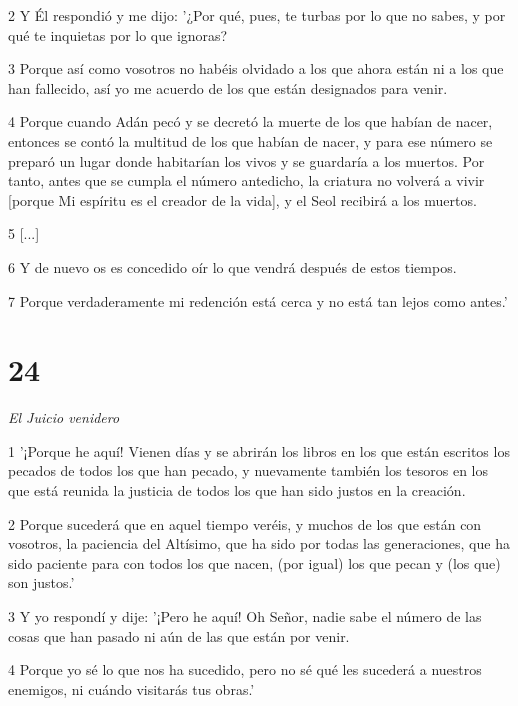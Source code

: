 \par 2 Y Él respondió y me dijo: '¿Por qué, pues, te turbas por lo que no sabes, y por qué te inquietas por lo que ignoras?

\par 3 Porque así como vosotros no habéis olvidado a los que ahora están ni a los que han fallecido, así yo me acuerdo de los que están designados para venir.

\par 4 Porque cuando Adán pecó y se decretó la muerte de los que habían de nacer, entonces se contó la multitud de los que habían de nacer, y para ese número se preparó un lugar donde habitarían los vivos y se guardaría a los muertos. Por tanto, antes que se cumpla el número antedicho, la criatura no volverá a vivir [porque Mi espíritu es el creador de la vida], y el Seol recibirá a los muertos.

\par 5 [...]

\par 6 Y de nuevo os es concedido oír lo que vendrá después de estos tiempos.

\par 7 Porque verdaderamente mi redención está cerca y no está tan lejos como antes.'

\chapter{24}

\par \textit{El Juicio venidero}

\par 1 '¡Porque he aquí! Vienen días y se abrirán los libros en los que están escritos los pecados de todos los que han pecado, y nuevamente también los tesoros en los que está reunida la justicia de todos los que han sido justos en la creación.

\par 2 Porque sucederá que en aquel tiempo veréis, y muchos de los que están con vosotros, la paciencia del Altísimo, que ha sido por todas las generaciones, que ha sido paciente para con todos los que nacen, (por igual) los que pecan y (los que) son justos.'

\par 3 Y yo respondí y dije: '¡Pero he aquí! Oh Señor, nadie sabe el número de las cosas que han pasado ni aún de las que están por venir.

\par 4 Porque yo sé lo que nos ha sucedido, pero no sé qué les sucederá a nuestros enemigos, ni cuándo visitarás tus obras.'

